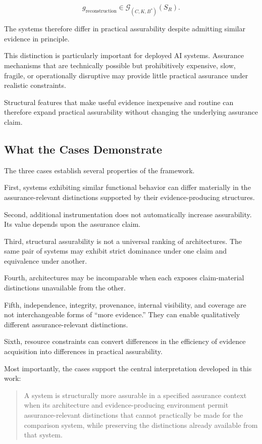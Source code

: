 \begin{equation}
  g_{\mathrm{reconstruction}}
  \in
  \mathcal{G}_{(C,K,B^\ast)}(S_R).
\end{equation}

The systems therefore differ in practical assurability despite
admitting similar evidence in principle.

This distinction is particularly important for deployed AI systems.
Assurance mechanisms that are technically possible but prohibitively
expensive, slow, fragile, or operationally disruptive may provide
little practical assurance under realistic constraints.

Structural features that make useful evidence inexpensive and routine
can therefore expand practical assurability without changing the
underlying assurance claim.

\subsection{What the Cases Demonstrate}
\label{aa.subsec.case-summary}

The three cases establish several properties of the framework.

First, systems exhibiting similar functional behavior can differ
materially in the assurance-relevant distinctions supported by their
evidence-producing structures.

Second, additional instrumentation does not automatically increase
assurability.
Its value depends upon the assurance claim.

Third, structural assurability is not a universal ranking of architectures.
The same pair of systems may exhibit strict dominance under one claim
and equivalence under another.

Fourth, architectures may be incomparable when each exposes
claim-material distinctions unavailable from the other.

Fifth, independence, integrity, provenance, internal visibility, and
coverage are not interchangeable forms of ``more evidence.''
They can enable qualitatively different assurance-relevant distinctions.

Sixth, resource constraints can convert differences in the efficiency
of evidence acquisition into differences in practical assurability.

Most importantly, the cases support the central interpretation
developed in this work:

\begin{quote}
  A system is structurally more assurable in a specified assurance
  context when its architecture and evidence-producing environment
  permit assurance-relevant distinctions that cannot practically
  be made for the comparison system, while preserving the
  distinctions already available from that system.
\end{quote}

